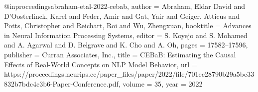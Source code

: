 @inproceedings{abraham-etal-2022-cebab,
	author = {Abraham, Eldar David and D'Oosterlinck, Karel and Feder, Amir and Gat, Yair and Geiger, Atticus and Potts, Christopher and Reichart, Roi and Wu, Zhengxuan},
	booktitle = {Advances in Neural Information Processing Systems},
	editor = {S. Koyejo and S. Mohamed and A. Agarwal and D. Belgrave and K. Cho and A. Oh},
	pages = {17582--17596},
	publisher = {Curran Associates, Inc.},
	title = {{CEBaB}: Estimating the Causal Effects of Real-World Concepts on NLP Model Behavior},
	url = {https://proceedings.neurips.cc/paper_files/paper/2022/file/701ec28790b29a5bc33832b7bdc4c3b6-Paper-Conference.pdf},
	volume = {35},
	year = {2022}}
